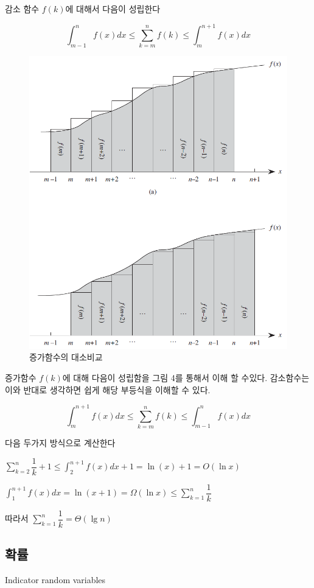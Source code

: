 \documentclass{oblivoir}
\begin{document}
감소 함수 $f(k)$에 대해서 다음이 성립한다

$$\int_{m-1}^{n}f(x)dx \le \sum_{k=m}^n f(k) \le \int_{m}^{n+1}f(x)dx$$


\begin{figure}[h!]
    \centering
    \includegraphics[scale=0.5]{q5.png}
    \caption{증가함수의 대소비교}
\end{figure}

증가함수 $f(k)$에 대해 다음이 성립함을 그림 4를 통해서 이해 할 수있다. 감소함수는 이와 반대로 생각하면 쉽게 해당 부등식을 이해할 수 있다.

$$\int_{m}^{n+1}f(x)dx \le \sum_{k=m}^n f(k) \le \int_{m-1}^{n}f(x)dx$$

다음 두가지 방식으로 계산한다

$\sum_{k=2}^n \dfrac{1}{k}+1 \le \int_{2}^{n+1}f(x)dx +1= \ln (x)+1 = O(\ln x)$

$\int_{1}^{n+1}f(x)dx =\ln (x+1) = \Omega(\ln x) \le \sum_{k=1}^n \dfrac{1}{k} $

따라서 $\sum_{k=1}^n \dfrac{1}{k} = \Theta(\lg n)$



\subsection{확률} Indicator random variables
\end{document}
